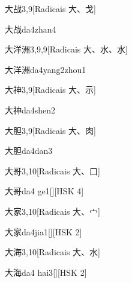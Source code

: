 \begin{entry}{大战}{3,9}[Radicais ⼤、⼽]
  \begin{phonetics}{大战}{da4zhan4}
  \end{phonetics}
\end{entry}

\begin{entry}{大洋洲}{3,9,9}[Radicais ⼤、⽔、⽔]
  \begin{phonetics}{大洋洲}{da4yang2zhou1}
  \end{phonetics}
\end{entry}

\begin{entry}{大神}{3,9}[Radicais ⼤、⽰]
  \begin{phonetics}{大神}{da4shen2}
  \end{phonetics}
\end{entry}

\begin{entry}{大胆}{3,9}[Radicais ⼤、⾁]
  \begin{phonetics}{大胆}{da4dan3}
  \end{phonetics}
\end{entry}

\begin{entry}{大哥}{3,10}[Radicais ⼤、⼝]
  \begin{phonetics}{大哥}{da4 ge1}[][HSK 4]
  \end{phonetics}
\end{entry}

\begin{entry}{大家}{3,10}[Radicais ⼤、⼧]
  \begin{phonetics}{大家}{da4jia1}[][HSK 2]
  \end{phonetics}
\end{entry}

\begin{entry}{大海}{3,10}[Radicais ⼤、⽔]
  \begin{phonetics}{大海}{da4 hai3}[][HSK 2]
  \end{phonetics}
\end{entry}

